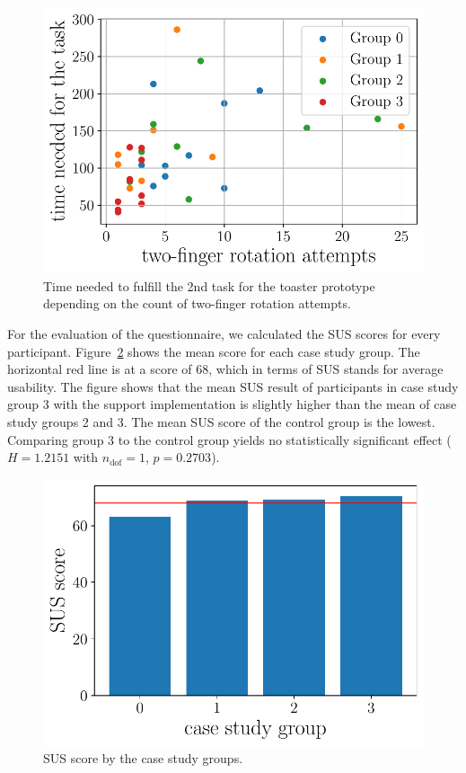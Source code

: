 \documentclass[manuscript]{acmart}
\begin{document}
			\begin{figure}[H]
				\centering
				\includegraphics[width=.49\textwidth]{img/plot/plot_scatter.pdf}
				\caption{Time needed to fulfill the 2nd task for the toaster prototype depending on the count of two-finger rotation attempts.}
				\label{fig:scatter}
			\end{figure}

			For the evaluation of the questionnaire, we calculated the \ac{SUS} scores for every participant. Figure~\ref{fig:sus} shows the mean score for each case study group. The horizontal red line is at a score of 68, which in terms of \ac{SUS} stands for average usability. The figure shows that the mean \ac{SUS} result of participants in case study group 3 with the support implementation is slightly higher than the mean of case study groups 2 and 3. The mean \ac{SUS} score of the control group is the lowest. Comparing group 3 to the control group yields no statistically significant effect ($H = 1.2151$ with $n_\text{dof} = 1$, $p = 0.2703$).

			\begin{figure}[H]
				\centering
				\includegraphics[width=.49\textwidth]{img/plot/plot_sus.pdf}
				\caption{SUS score by the case study groups.}
				\label{fig:sus}
			\end{figure}
\end{document}
